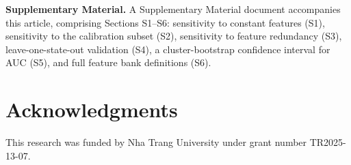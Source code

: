 \documentclass[11pt,a4paper]{article}
\begin{document}
\bigskip
\noindent\textbf{Supplementary Material.} A Supplementary Material document
accompanies this article, comprising Sections S1--S6: sensitivity to
constant features (S1), sensitivity to the calibration subset (S2),
sensitivity to feature redundancy (S3), leave-one-state-out validation
(S4), a cluster-bootstrap confidence interval for AUC (S5), and full
feature bank definitions (S6).
\color{black}

\section*{Acknowledgments}
This research was funded by Nha Trang University under grant number
TR2025-13-07.

\end{document}
